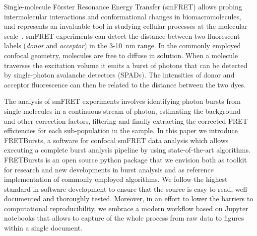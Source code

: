 Single-molecule Förster Resonance Energy Transfer (smFRET) allows probing intermolecular interactions
and conformational changes in biomacromolecules, and represents an 
invaluable tool in studying cellular processes at the molecular 
scale~\cite{Kapanidis_2006}. smFRET experiments can detect the distance between 
two fluorescent labels (\textit{donor} and \textit{acceptor}) in the 
3-10~nm range. In the commonly employed confocal geometry, molecules are free 
to diffuse in solution. When a molecule traverses the excitation volume it 
emits a burst of photons that can be detected by single-photon avalanche detectors (SPADs). 
The intensities of donor and acceptor fluorescence 
can then be related to the distance between the two dyes.

The analysis of smFRET experiments involves identifying photon bursts from 
single-molecules in a continuous stream of photon, estimating the 
background and other correction factors, filtering and finally extracting the corrected 
FRET efficiencies for each sub-population in the sample. In this paper we introduce FRETBursts,
a software for confocal smFRET data analysis which 
allows executing a complete burst analysis pipeline by using state-of-the-art algorithms.
FRETBursts is an open source python package that we envision both as toolkit 
for research and new developments in burst analysis and as reference implementation of commonly employed algorithms.
We follow the highest standard in software development to ensure that 
the source is easy to read, well documented and thoroughly tested. 
Moreover, in an effort to lower the barriers to computational reproducibility, 
we embrace a modern workflow based on Jupyter notebooks that allows to capture 
of the whole process from raw data to figures within a single document.
